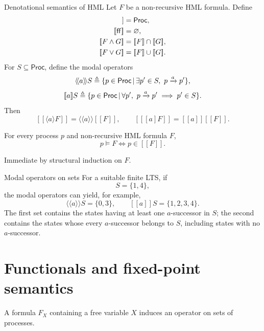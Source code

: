 \documentclass[a4paper]{article}
\newcommand{\Proc}{\mathsf{Proc}}
\newcommand{\ttt}{\mathsf{tt}}
\newcommand{\fff}{\mathsf{ff}}
\newcommand{\sem}[1]{[\![#1]\!]}
\newcommand{\trans}[1]{\xrightarrow{#1}}
\begin{document}
\begin{snippetdefinition}{Denotational semantics of HML}
    Let \(F\) be a non-recursive HML formula. Define
    \begin{align*}
        \sem{\ttt} &= \Proc,\\
        \sem{\fff} &= \emptyset,\\
        \sem{F\land G} &= \sem{F}\intersection\sem{G},\\
        \sem{F\lor G} &= \sem{F}\union\sem{G}.
    \end{align*}
    For \(S\subseteq\Proc\), define the modal operators
    \[
        \langle\!\langle a\rangle\!\rangle S
        \triangleq
        \{p\in\Proc\suchthat
        \exists p'\in S,\ p\trans{a}p'\},
    \]
    \[
        [\![a]\!]S
        \triangleq
        \{p\in\Proc\suchthat
        \forall p',\ p\trans{a}p'\implies p'\in S\}.
    \]
    Then
    \[
        \sem{\langle a\rangle F}
        =\langle\!\langle a\rangle\!\rangle\sem{F},
        \qquad
        \sem{[a]F}
        =[\![a]\!]\sem{F}.
    \]
\end{snippetdefinition}

\begin{snippettheorem}{}
    For every process \(p\) and non-recursive HML formula \(F\),
    \[
        p\models F
        \iff
        p\in\sem{F}.
    \]
\end{snippettheorem}

\begin{snippetproof}{}
    Immediate by structural induction on \(F\).
\end{snippetproof}

\begin{snippetexample}{Modal operators on sets}
    For a suitable finite LTS, if
    \[
        S=\{1,4\},
    \]
    the modal operators can yield, for example,
    \[
        \langle\!\langle a\rangle\!\rangle S=\{0,3\},
        \qquad
        [\![a]\!]S=\{1,2,3,4\}.
    \]
    The first set contains the states having at least one \(a\)-successor in \(S\); the second contains the states whose every \(a\)-successor belongs to \(S\), including states with no \(a\)-successor.
\end{snippetexample}

\section{Functionals and fixed-point semantics}

A formula \(F_X\) containing a free variable \(X\) induces an operator on sets of processes.
\end{document}

